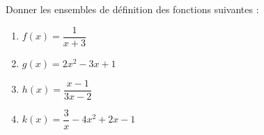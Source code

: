 
\begin{exercice}\label{exosmath-0268}

Donner les ensembles de définition des fonctions suivantes :
\begin{multicols}{2}
  \begin{enumerate}
\item $f(x) = \dfrac1{x+3}$
\item $g(x) = 2x^2-3x+1$
\item $h(x) = \dfrac{x-1}{3x-2}$
\item $k(x) = \dfrac3{x} - 4x^2 +2x -1$
\end{enumerate}
\end{multicols}

\end{exercice}
